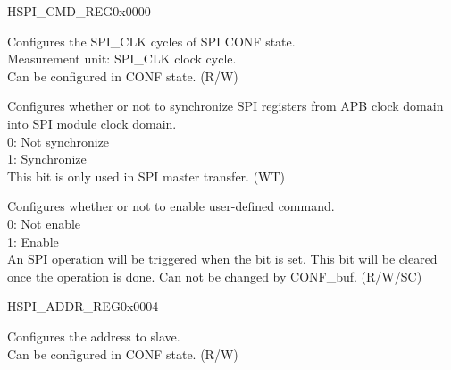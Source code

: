\begin{register}{H}{SPI\_CMD\_REG}{0x0000}\label{regdesc:SPICMDREG}
%
%
%
%
%
\regnewline%
\begin{regdesc}\begin{reglist}
\label{fielddesc:SPICONFBITLEN}\item [SPI\_CONF\_BITLEN] Configures the SPI\_CLK cycles of SPI CONF state. \\
Measurement unit: SPI\_CLK clock cycle.\\
Can be configured in CONF state.  (R/W)
\label{fielddesc:SPIUPDATE}\item [SPI\_UPDATE] Configures whether or not to synchronize SPI registers from APB clock domain into SPI module clock domain. \\
0: Not synchronize \\
1: Synchronize \\
This bit is only used in SPI master transfer.  (WT)
\label{fielddesc:SPIUSR}\item [SPI\_USR] Configures whether or not to enable user-defined command. \\
0: Not enable \\
1: Enable \\
An SPI operation will be triggered when the bit is set. This bit will be cleared once the operation is done. Can not be changed by CONF\_buf. (R/W/SC)
\end{reglist}\end{regdesc}
\end{register}


\begin{register}{H}{SPI\_ADDR\_REG}{0x0004}\label{regdesc:SPIADDRREG}
%
\regnewline%
\begin{regdesc}\begin{reglist}
\label{fielddesc:SPIUSRADDRVALUE}\item [SPI\_USR\_ADDR\_VALUE] Configures the address to slave. \\
Can be configured in CONF state. (R/W)
\end{reglist}\end{regdesc}
\end{register}


